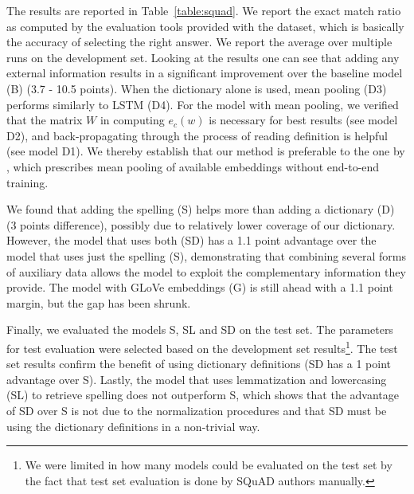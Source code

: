 The results are reported in Table~\ref{table:squad}. We report the exact match ratio as computed by the evaluation tools provided with the dataset, which is basically the accuracy of selecting the right answer. We report 
the average over multiple runs on the development set.  Looking at the results one can see that adding any external information results in a significant improvement over the baseline model (B) (3.7 - 10.5 points). When the dictionary alone is used, mean pooling (D3) performs similarly to LSTM (D4).
For the model with mean pooling, we verified that the matrix $W$ in computing $e_c(w)$ is necessary for best results (see model D2), and back-propagating through the process of reading definition is helpful (see model D1). We thereby establish that our method is preferable to the one by \citet{long2016leveraging}, which prescribes mean pooling of available embeddings without end-to-end training.



We found that adding the spelling (S) helps more than adding a dictionary (D) (3 points difference), possibly due to relatively lower coverage 
of our dictionary. However,  the model that uses both (SD) has a 1.1 point
advantage over the model that uses just the spelling (S), demonstrating that combining several forms of auxiliary data allows the model to exploit the complementary information they provide. The model with GLoVe embeddings (G) is still ahead with a 1.1 point margin, but the gap has been shrunk. 

Finally, we evaluated the models S, SL and SD on the test set. The parameters for test evaluation were selected based on the development set results\footnote{We were limited in how many models could be evaluated on the test set by the fact that test set evaluation is done by SQuAD authors manually.}. The test set results confirm the benefit of using dictionary definitions (SD has a 1 point advantage over S).  Lastly, the model that uses lemmatization and lowercasing (SL) to retrieve spelling does not outperform S, which shows that the advantage of SD over S is not due to the normalization procedures and that SD must be using the dictionary definitions in a non-trivial way.

